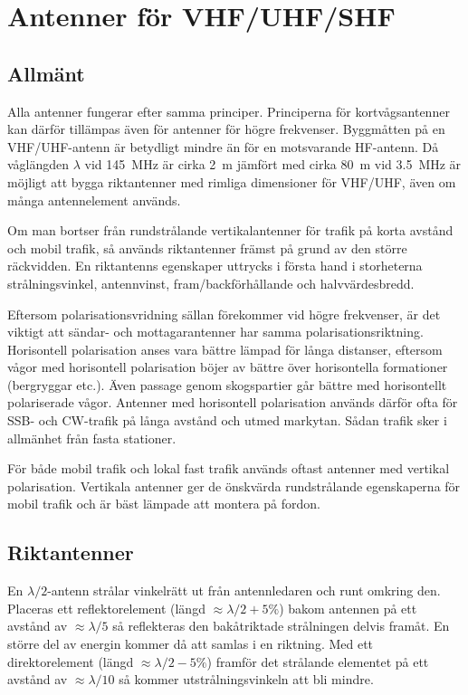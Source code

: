 \clearpage
\section{Antenner för VHF/UHF/SHF}

\subsection{Allmänt}
\label{antenner_vhf_allmänt}

Alla antenner fungerar efter samma principer.
Principerna för kortvågsantenner kan därför tillämpas även för antenner för
högre frekvenser.
Byggmåtten på en VHF/UHF-antenn är betydligt mindre än för en motsvarande
HF-antenn.
Då våglängden \(\lambda\) vid \SI{145}{\mega\hertz} är cirka \SI{2}{\metre}
jämfört med cirka \SI{80}{\metre} vid \SI{3,5}{\mega\hertz} är möjligt att
bygga riktantenner med rimliga dimensioner för VHF/UHF, även om många
antennelement används.

Om man bortser från rundstrålande vertikalantenner för trafik på korta avstånd
och mobil trafik, så används riktantenner främst på grund av den större
räckvidden.
En riktantenns egenskaper uttrycks i första hand i storheterna strålningsvinkel,
antennvinst, fram/backförhållande och halvvärdesbredd.

Eftersom polarisationsvridning sällan förekommer vid högre frekvenser, är det
viktigt att sändar- och mottagarantenner har samma polarisationsriktning.
Horisontell polarisation anses vara bättre lämpad för långa distanser, eftersom
vågor med horisontell polarisation böjer av bättre över horisontella
formationer (bergryggar etc.).
Även passage genom skogspartier går bättre med horisontellt polariserade vågor.
Antenner med horisontell polarisation används därför ofta för SSB- och CW-trafik
på långa avstånd och utmed markytan.
Sådan trafik sker i allmänhet från fasta stationer.

För både mobil trafik och lokal fast trafik används oftast antenner med vertikal
polarisation.
Vertikala antenner ger de önskvärda rundstrålande egenskaperna för mobil trafik
och är bäst lämpade att montera på fordon.

\subsection{Riktantenner}
\label{riktantenn}

En \(\lambda/2\)-antenn strålar vinkelrätt ut från antennledaren och
runt omkring den.
Placeras ett reflektorelement (längd \(\approx\lambda/2 + 5\%\)) bakom antennen
på ett avstånd av \(\approx \lambda/5\) så reflekteras den bakåtriktade
strålningen delvis framåt.
En större del av energin kommer då att samlas i en riktning.
Med ett direktorelement (längd \(\approx\lambda/2 - 5\%\)) framför det
strålande elementet på ett avstånd av \(\approx\lambda/10\) så kommer
utstrålningsvinkeln att bli mindre.

